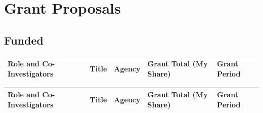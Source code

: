 \section*{Grant Proposals}

\subsection*{Funded}%

\ifdefined\iscockrell
{\footnotesize
  \begin{center}
    \begin{longtable}{p{1.7cm}p{6.5cm}p{3cm}P{1.5cm}p{1.0cm}}
      \centering\textbf{Role and} \newline \textbf{Co-Investigators}  & \centering\textbf{Title} & \centering\textbf{Agency} & \centering\textbf{Grant Total} \newline \textbf{(My Share)} & \textbf{Grant Period} \\
      \midrule
      
      \bottomrule
    \end{longtable}
  \end{center}
}
\else
\ifdefined\ispdf
{\footnotesize
  \begin{center}
    \begin{longtable}{p{1.7cm}p{6.5cm}p{3cm}P{1.5cm}p{1.0cm}}
      \centering\textbf{Role and} \newline \textbf{Co-Investigators}  & \centering\textbf{Title} & \centering\textbf{Agency} & \centering\textbf{Grant Total} \newline \textbf{(My Share)} & \textbf{Grant Period} \\
      \midrule
      
      \bottomrule
    \end{longtable}
  \end{center}
}
\fi
\fi



